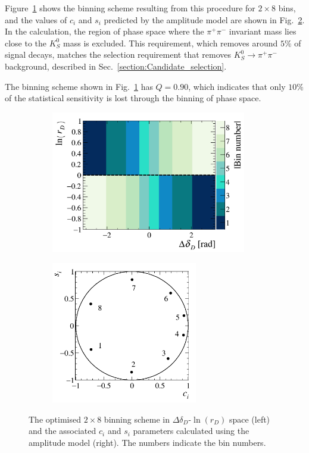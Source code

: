 \documentclass[12pt, a4paper, notitlepage, onecolumn]{article}
\begin{document}
Figure~\ref{figure:Binning_scheme_plot_8bins} shows the binning scheme resulting from this procedure for $2 \times 8$ bins, and the values of $c_i$ and $s_i$ predicted by the amplitude model are shown in Fig.~\ref{figure:ci_si_2x8}. In the calculation, the region of phase space where the $\pi^+\pi^-$ invariant mass lies close to the $K^0_S$ mass is excluded. This requirement, which removes around $5\%$ of signal decays, matches the selection requirement that removes $K^0_S\to\pi^+\pi^-$ background, described in Sec.~\ref{section:Candidate_selection}.

The binning scheme shown in Fig.~\ref{figure:Binning_scheme_plot_8bins} has $Q = 0.90$, which indicates that only $10\%$ of the statistical sensitivity is lost through the binning of phase space.

\begin{figure}[htb]
    \centering
    \begin{subfigure}{0.57\textwidth}
        \includegraphics[height=6.2cm]{Plots/BinningSchemePlot_8Bins.png}
        \caption{}
        \label{figure:Binning_scheme_plot_8bins}
    \end{subfigure}%
    \hfill
    \begin{subfigure}{0.43\textwidth}
        \includegraphics[height=6.2cm]{Plots/StrongPhaseParametersPlot_cisi_8Bins.png}
        \caption{}
        \label{figure:ci_si_2x8}
    \end{subfigure}
    \caption{The optimised $2\times 8$ binning scheme in $\Delta \delta_D$-$\ln(r_D)$ space (left) and the associated $c_i$ and $s_i$ parameters calculated using the amplitude  model (right). The numbers indicate the bin numbers.}
    \label{figure:Binning_scheme_plots_8bins}
\end{figure}
\end{document}
